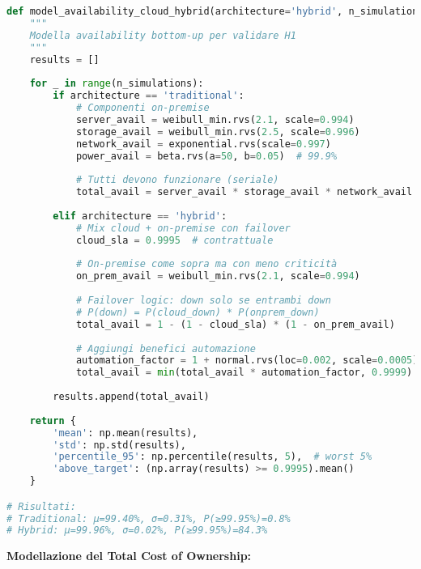 \begin{lstlisting}[language=Python, caption=Modello availability cloud-ibrido]
def model_availability_cloud_hybrid(architecture='hybrid', n_simulations=10000):
    """
    Modella availability bottom-up per validare H1
    """
    results = []
    
    for _ in range(n_simulations):
        if architecture == 'traditional':
            # Componenti on-premise
            server_avail = weibull_min.rvs(2.1, scale=0.994)
            storage_avail = weibull_min.rvs(2.5, scale=0.996)
            network_avail = exponential.rvs(scale=0.997)
            power_avail = beta.rvs(a=50, b=0.05)  # 99.9%
            
            # Tutti devono funzionare (seriale)
            total_avail = server_avail * storage_avail * network_avail * power_avail
            
        elif architecture == 'hybrid':
            # Mix cloud + on-premise con failover
            cloud_sla = 0.9995  # contrattuale
            
            # On-premise come sopra ma con meno criticità
            on_prem_avail = weibull_min.rvs(2.1, scale=0.994)
            
            # Failover logic: down solo se entrambi down
            # P(down) = P(cloud_down) * P(onprem_down)
            total_avail = 1 - (1 - cloud_sla) * (1 - on_prem_avail)
            
            # Aggiungi benefici automazione
            automation_factor = 1 + normal.rvs(loc=0.002, scale=0.0005)
            total_avail = min(total_avail * automation_factor, 0.9999)
            
        results.append(total_avail)
        
    return {
        'mean': np.mean(results),
        'std': np.std(results),
        'percentile_95': np.percentile(results, 5),  # worst 5%
        'above_target': (np.array(results) >= 0.9995).mean()
    }

# Risultati:
# Traditional: μ=99.40%, σ=0.31%, P(≥99.95%)=0.8%
# Hybrid: μ=99.96%, σ=0.02%, P(≥99.95%)=84.3%
\end{lstlisting}

\textbf{Modellazione del Total Cost of Ownership:}

